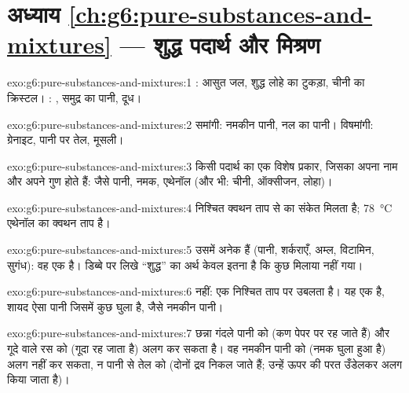 \section*{अध्याय \ref{ch:g6:pure-substances-and-mixtures} --- शुद्ध पदार्थ और मिश्रण}

\begin{solution}{exo:g6:pure-substances-and-mixtures:1}
: आसुत जल, शुद्ध लोहे का टुकड़ा, चीनी का
क्रिस्टल। : , समुद्र का पानी, दूध।
\end{solution}

\begin{solution}{exo:g6:pure-substances-and-mixtures:2}
समांगी: नमकीन पानी, नल का पानी। विषमांगी: ग्रेनाइट, पानी पर
तेल, मूसली।
\end{solution}

\begin{solution}{exo:g6:pure-substances-and-mixtures:3}
किसी पदार्थ का एक विशेष प्रकार, जिसका अपना नाम और अपने गुण होते हैं: जैसे
पानी, नमक, एथेनॉल (और भी: चीनी, ऑक्सीजन, लोहा)।
\end{solution}

\begin{solution}{exo:g6:pure-substances-and-mixtures:4}
निश्चित क्वथन ताप से  का संकेत मिलता है; \qty{78}{\celsius}
एथेनॉल का क्वथन ताप है।
\end{solution}

\begin{solution}{exo:g6:pure-substances-and-mixtures:5}
उसमें अनेक  हैं (पानी, शर्कराएँ, अम्ल, विटामिन,
सुगंध): वह एक  है। डिब्बे पर लिखे ``शुद्ध'' का अर्थ केवल इतना है कि
कुछ मिलाया नहीं गया।
\end{solution}

\begin{solution}{exo:g6:pure-substances-and-mixtures:6}
नहीं:  एक निश्चित ताप पर उबलता है। यह एक  है,
शायद ऐसा पानी जिसमें कुछ घुला है, जैसे नमकीन पानी।
\end{solution}

\begin{solution}{exo:g6:pure-substances-and-mixtures:7}
छन्ना गंदले पानी को (कण पेपर पर रह जाते हैं) और गूदे वाले रस को
(गूदा रह जाता है) अलग कर सकता है। वह नमकीन पानी को (नमक घुला हुआ है) अलग
नहीं कर सकता, न पानी से तेल को (दोनों द्रव निकल जाते हैं; उन्हें ऊपर की परत
उँडेलकर अलग किया जाता है)।
\end{solution}

